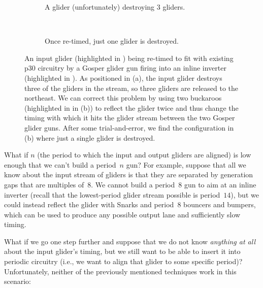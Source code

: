 \begin{figure}[!htb]
	\centering
	\begin{subfigure}{.49\textwidth}
		\centering
		\caption{A glider (unfortunately) destroying $3$ gliders.}
		\label{fig:inverter_as_regulator_0}
	\end{subfigure} \ \ \ %
	\begin{subfigure}{.48\textwidth}
		\centering
		\caption{Once re-timed, just one glider is destroyed.}
		\label{fig:inverter_as_regulator_1}
	\end{subfigure}
	\caption{An input glider (highlighted in ) being re-timed to fit with existing p$30$ circuitry by a Gosper glider gun firing into an inline inverter (highlighted in ). As positioned in (a), the input glider destroys three of the gliders in the stream, so three gliders are released to the northeast. We can correct this problem by using two buckaroos (highlighted in  in (b)) to reflect the glider twice and thus change the timing with which it hits the glider stream between the two Gosper glider guns. After some trial-and-error, we find the configuration in (b) where just a single glider is destroyed.}\label{fig:inverter_as_regulator}
\end{figure}

What if $n$ (the period to which the input and output gliders are aligned) is low enough that we can't build a period~$n$ gun? For example, suppose that all we know about the input stream of gliders is that they are separated by generation gaps that are multiples of~$8$. We cannot build a period~$8$ gun to aim at an inline inverter (recall that the lowest-period glider stream possible is period~$14$), but we could instead reflect the glider with Snarks and period~$8$ bouncers and bumpers, which can be used to produce any possible output lane and sufficiently slow timing.

What if we go one step further and suppose that we do not know \emph{anything at all} about the input glider's timing, but we still want to be able to insert it into periodic circuitry (i.e., we want to align that glider to some specific period)? Unfortunately, neither of the previously mentioned techniques work in this scenario:\smallskip

